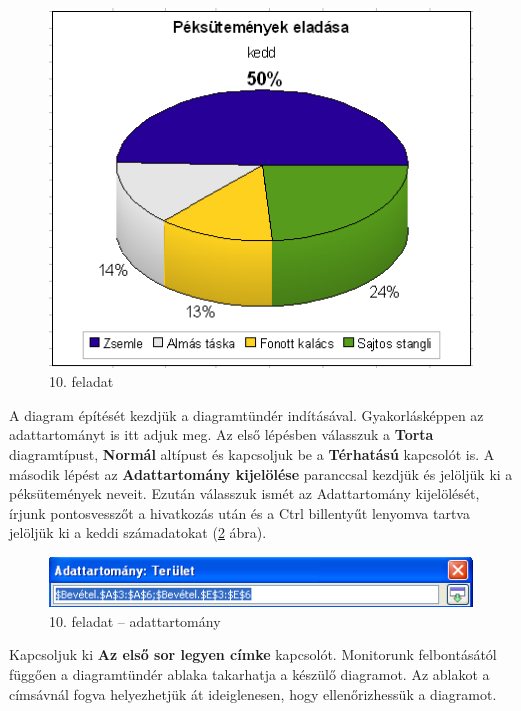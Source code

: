 \begin{figure}[!h]
\begin{center}
\includegraphics[width=11.324cm]{oocalcv2-img59.png}
\caption{10. feladat}\label{10-feladat}
\end{center}
\end{figure}

A diagram építését kezdjük a diagramtündér
indításával. Gyakorlásképpen az adattartományt is itt adjuk
meg. Az első lépésben válasszuk a \textbf{Torta}
diagramtípust, \textbf{Normál} altípust és kapcsoljuk be a
\textbf{Térhatású} kapcsolót is. A második lépést az
\textbf{Adattartomány kijelölése} paranccsal kezdjük és
jelöljük ki a péksütemények neveit. Ezután válasszuk
ismét az Adattartomány kijelölését, írjunk
pontosvesszőt a hivatkozás után és a Ctrl billentyűt
lenyomva tartva jelöljük ki a keddi számadatokat
(\ref{10-feladatAdattartomány} ábra).

\begin{figure}[!h]
\begin{center}
\includegraphics[width=11.589cm]{oocalcv2-img60.png}
\caption{10.  feladat --  adattartomány}\label{10-feladatAdattartomány}
\end{center}
\end{figure}

Kapcsoljuk ki \textbf{Az első sor legyen címke} kapcsolót.
Monitorunk felbontásától függően a diagramtündér ablaka
takarhatja a készülő diagramot. Az ablakot a címsávnál
fogva helyezhetjük át ideiglenesen, hogy ellenőrizhessük a
diagramot.

